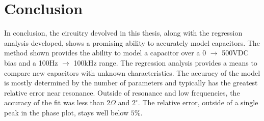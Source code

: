 \section {Conclusion}
\label{sec:conclusion}

In conclusion, the circuitry devolved in this thesis, along with the regression analysis developed, shows a promising ability to accurately model capacitors. The method shown provides the ability to model a capacitor over a 0 $\rightarrow$ 500VDC bias and a 100Hz $\rightarrow$ 100kHz range. The regression analysis provides a means to compare new capacitors with unknown characteristics. The accuracy of the model is mostly determined by the number of parameters and typically has the greatest relative error near resonance. Outside of resonance and low frequencies, the accuracy of the fit was less than $2 \Omega$ and $2^{\circ}$. The relative error, outside of a single peak in the phase plot, stays well below $5\%$.

